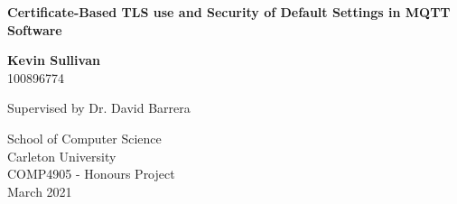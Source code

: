 \begin{titlepage}
    \begin{center}
        \vspace*{1cm}
            
        \Huge
        \textbf{Certificate-Based TLS use and Security of Default Settings in MQTT Software}
            
        \vspace{1.5cm}
        \Large  
        \textbf{Kevin Sullivan}\\100896774
            
        \vfill
        Supervised by Dr. David Barrera
        
        \vspace{0.8cm}

            
        \Large
        School of Computer Science \\
        Carleton University\\
        COMP4905 - Honours Project\\
        March 2021
            
    \end{center}
\end{titlepage}